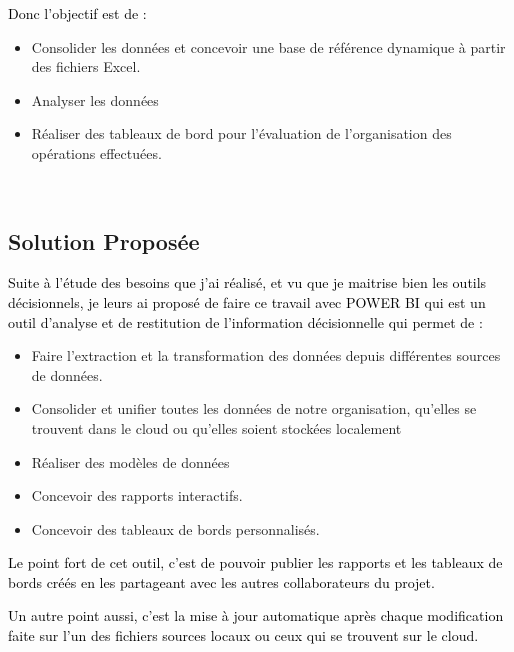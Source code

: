 \documentclass[a4paper,12pt]{report}
\begin{document}
\textcolor{black}{Donc l’objectif est de :}

\begin{itemize}
	\item Consolider les données et concevoir une base de référence dynamique à partir des fichiers Excel.
	\item Analyser les données
	\item Réaliser des tableaux de bord pour l'évaluation de l'organisation des opérations effectuées.
\end{itemize}
~~\\ 
 	
\subsection*{Solution Proposée}

\textcolor{black}{Suite à l’étude des besoins que j’ai réalisé, et vu que je maitrise bien les outils décisionnels, je leurs ai proposé de faire ce travail avec POWER BI qui est un outil d’analyse et de restitution de l’information décisionnelle qui permet de :}



\begin{itemize}
	\item Faire l’extraction et la transformation des données depuis différentes sources de données.
	\item Consolider et unifier toutes les données de notre organisation, qu’elles se trouvent dans le cloud ou qu’elles soient stockées localement
	\item Réaliser des modèles de données
	\item Concevoir des rapports interactifs.
	\item Concevoir des tableaux de bords personnalisés.
\end{itemize}


\textcolor{black}{Le point fort de cet outil, c’est de pouvoir publier les rapports et les tableaux de bords créés en les partageant avec les autres collaborateurs du projet.}

\textcolor{black}{Un autre point aussi, c’est la mise à jour automatique après chaque modification faite sur l’un des fichiers sources locaux ou ceux qui se trouvent sur le cloud.}
\end{document}
